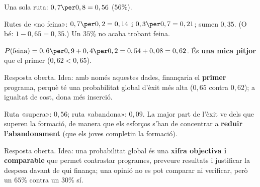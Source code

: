 \begin{solucions}
\begin{sollist}
  \item Una sola ruta: $0,7\per 0,8=0,56$ ($56\%$).
  \item Rutes de «no feina»: $0,7\per 0,2=0,14$ i $0,3\per 0,7=0,21$; sumen $0,35$. (O
        bé: $1-0,65=0,35$.) Un $35\%$ no acaba trobant feina.
  \item $P(\text{feina})=0,6\per 0,9+0,4\per 0,2=0,54+0,08=0,62$. És \textbf{una mica
        pitjor} que el primer ($0,62<0,65$).
  \item Resposta oberta. Idea: amb només aquestes dades, finançaria el \textbf{primer}
        programa, perquè té una probabilitat global d'èxit més alta ($0,65$ contra
        $0,62$); a igualtat de cost, dona més inserció.
  \item Ruta «supera»: $0,56$; ruta «abandona»: $0,09$. La major part de l'èxit ve dels
        que superen la formació, de manera que els esforços s'han de concentrar a
        \textbf{reduir l'abandonament} (que els joves completin la formació).
  \item Resposta oberta. Idea: una probabilitat global és una \textbf{xifra objectiva i
        comparable} que permet contrastar programes, preveure resultats i justificar la
        despesa davant de qui finança; una opinió no es pot comparar ni verificar, però
        un $65\%$ contra un $30\%$ sí.
\end{sollist}
\end{solucions}
